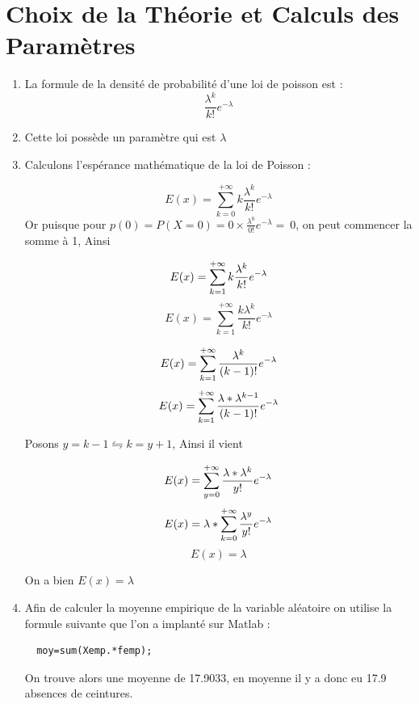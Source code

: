 \documentclass[a4paper,oneside]{article}
\begin{document}
\section{Choix de la Théorie et Calculs des Paramètres}

\begin{enumerate}
  \item

La formule de la densité de probabilité d'une loi de poisson est :
  \[
\frac{\lambda^k}{k!} e^{- \lambda}
  \]

  \item

  Cette loi possède un paramètre qui est $\lambda$

  \item Calculons l'espérance mathématique de la loi de Poisson :

\[
 E(x) = \sum_{k=0}^{+\infty} k\frac{\lambda^k}{k!} e^{-\lambda}
\]
Or puisque pour $p(0) =  P(X = 0)= 0 \times \frac{\lambda^0}{0!} e^{- \lambda} =\ 0$, on peut commencer la somme à 1, Ainsi 

\[
 E(x) =  \sum_{k=1}^{+\infty} k\frac{\lambda^k}{k!} e^{- \lambda}\\
 \]
 \[
 E(x) =  \sum_{k=1}^{+\infty} \frac{k \lambda^k}{k!} e^{-\lambda}
 \]
 
 \[
 E(x) =  \sum_{k=1}^{+\infty} \frac{ \lambda^k}{(k-1)!} e^{- \lambda}\\
 \]
 \[
  E(x) =  \sum_{k=1}^{+\infty} \frac{ \lambda*\lambda^{k-1}}{(k-1)!} e^{- \lambda}\\
\]

Posons $y=k-1 \leftrightharpoons k=y+1$, Ainsi il vient

\[
	  E(x) =  \sum_{y=0}^{+\infty} \frac{ \lambda*\lambda^{k}}{y!} e^{- \lambda}\\
\]
\[	  
	    E(x) =  \lambda*\sum_{k=0}^{+\infty} \frac{ \lambda^{y}}{y!} e^{- \lambda}\\
\]
\[	    
	    E(x) = \lambda
\]

On a bien $E(x) = \lambda$

  \item

Afin de calculer la moyenne empirique de la variable aléatoire on utilise la formule suivante que l'on a implanté sur Matlab :

\begin{lstlisting}
  moy=sum(Xemp.*femp);
\end{lstlisting}

On trouve alors une moyenne de 17.9033, en moyenne il y a donc eu 17.9 absences de ceintures.\\


\end{enumerate}
\end{document}
